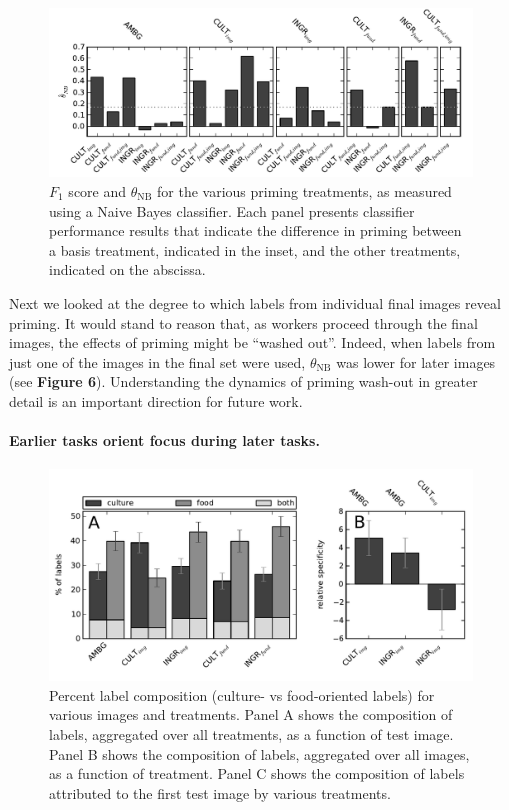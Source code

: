 \documentclass[a4paper]{report}
\begin{document}
\begin{figure}
	\includegraphics[scale=0.94]{figs/f1-thetas_full_pairwise25_img1.pdf}
	\caption{ $F_1$ score and $\theta_\text{NB}$ for the various 
priming treatments, as measured using a Naive Bayes classifier. Each panel 
presents classifier performance results that indicate the difference in
priming between a basis 
treatment, indicated in the inset, and the other treatments, indicated on the
abscissa. }
\end{figure}

Next we looked at the degree to which labels from individual final images 
reveal priming.  It would stand to reason that, as workers proceed through 
the final images, the effects of priming might be ``washed out''.  
Indeed, when labels from just one of the images
in the final set were used, $\theta_\text{NB}$ was lower for later images (see
\textbf{Figure 6}).
Understanding the dynamics of priming wash-out in greater detail is an 
important direction for future work.

\paragraph{Earlier tasks orient focus during later tasks.} 
\begin{figure}
	\includegraphics[scale=0.94]{figs/orientation_specificity.pdf}
	\caption{Percent label composition (culture- vs food-oriented labels) for 
		various images and treatments.  Panel A shows the composition of 
		labels, aggregated over all treatments, as a function of test image.
		Panel B shows the composition of labels, aggregated over all images, as
		a function of treatment.  Panel C shows the composition of labels 
		attributed to the first test image by various treatments.}
\end{figure}
\end{document}

